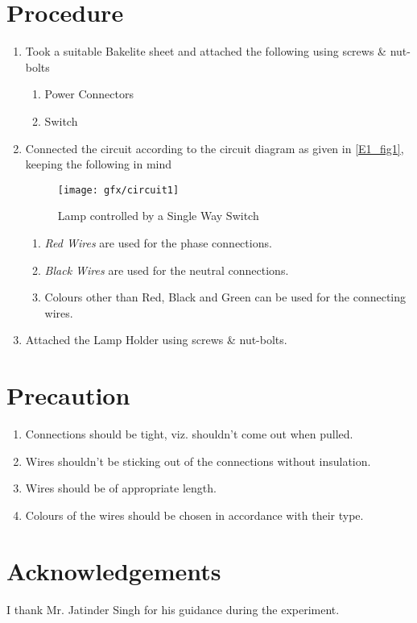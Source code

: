 \section{Procedure}
	\begin{enumerate}
		\item Took a suitable Bakelite sheet and attached the following using screws \& nut-bolts
			\begin{enumerate}
				\item Power Connectors
				\item Switch
			\end{enumerate} 
		\item Connected the circuit according to the circuit diagram as given in \autoref{E1_fig1}, keeping the following in mind
		\begin{figure}[bth]
			\begin{center}
				\texttt{[image: gfx/circuit1]}
			\end{center}
		\caption[Lamp - Single Way Switch]{Lamp controlled by a Single Way Switch}\label{E1_fig1}
		\end{figure}

			\begin{enumerate}
				\item \emph{Red Wires} are used for the phase connections.
				\item \emph{Black Wires} are used for the neutral connections.
				\item Colours other than Red, Black and Green can be used for the connecting wires.
			\end{enumerate}	
		\item Attached the Lamp Holder using screws \& nut-bolts.
	\end{enumerate}
\section{Precaution}
	\begin{enumerate}
		\item Connections should be tight, viz. shouldn't come out when pulled.
		\item Wires shouldn't be sticking out of the connections without insulation.
		\item Wires should be of appropriate length.
		\item Colours of the wires should be chosen in accordance with their type.
	\end{enumerate}	
\section{Acknowledgements}
I thank Mr. Jatinder Singh for his guidance during the experiment.